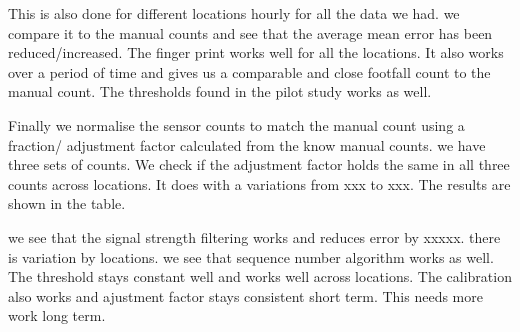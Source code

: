 This is also done for different locations hourly for all the data we had.
we compare it to the manual counts and see that the average mean error
has been reduced/increased. The finger print works well for all the locations.
It also works over a period of time and gives us a comparable and close 
footfall count to the manual count. The thresholds found in the pilot study
works as well.

Finally we normalise the sensor counts to match the manual count using
a fraction/ adjustment factor calculated from the know manual counts.
we have three sets of counts. We check if the adjustment factor holds the
same in all three counts across locations. It does with a variations from
xxx to xxx. The results are shown in the table. 

we see that the signal strength filtering works and reduces error by
xxxxx. there is variation by locations.
we see that sequence number algorithm works as well. The threshold stays
constant well and works well across locations. The calibration also works
and ajustment factor stays consistent short term. This needs more work 
long term.
